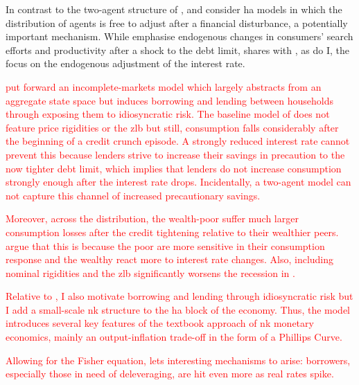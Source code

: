 \documentclass[12pt]{article} %
\numberwithin{equation}{section} %
\begin{document}
In contrast to the two-agent structure of \textcite{egg2012}, \textcite{riosrull2015} and \textcite{gl2017} consider \Gls{ha} models in which the distribution of agents is free to adjust after a financial disturbance, a potentially important mechanism. While \textcite{riosrull2015} emphasise endogenous changes in consumers' search efforts and productivity after a shock to the debt limit, \textcite{gl2017} shares with \textcite{egg2012}, as do I, the focus on the endogenous adjustment of the interest rate.

\textcolor{red}{\textcite{gl2017} put forward an incomplete-markets model which largely abstracts from an aggregate state space but induces borrowing and lending between households through exposing them to idiosyncratic risk. The baseline model of \textcite{gl2017} does not feature price rigidities or the \Gls{zlb} but still, consumption falls considerably after the beginning of a credit crunch episode. A strongly reduced interest rate cannot prevent this because lenders strive to increase their savings in precaution to the now tighter debt limit, which implies that lenders do not increase consumption strongly enough after the interest rate drops. Incidentally, a two-agent model can not capture this channel of increased precautionary savings.}

\textcolor{red}{Moreover, across the distribution, the wealth-poor suffer much larger consumption losses after the credit tightening relative to their wealthier peers. \textcite{gl2017} argue that this is because the poor are more sensitive in their consumption response and the wealthy react more to interest rate changes. Also, including nominal rigidities and the \Gls{zlb} significantly worsens the recession in \textcite{gl2017}.}

\textcolor{red}{Relative to \textcite{gl2017}, I also motivate borrowing and lending through idiosyncratic risk but I add a small-scale \Gls{nk} structure to the \Gls{ha} block of the economy. Thus, the model introduces several key features of the textbook approach of \Gls{nk} monetary economics, mainly an output-inflation trade-off in the form of a Phillips Curve.} 

\textcolor{red}{Allowing for the Fisher equation, lets interesting mechanisms to arise: borrowers, especially those in need of deleveraging, are hit even more as real rates spike.}

\end{document}
